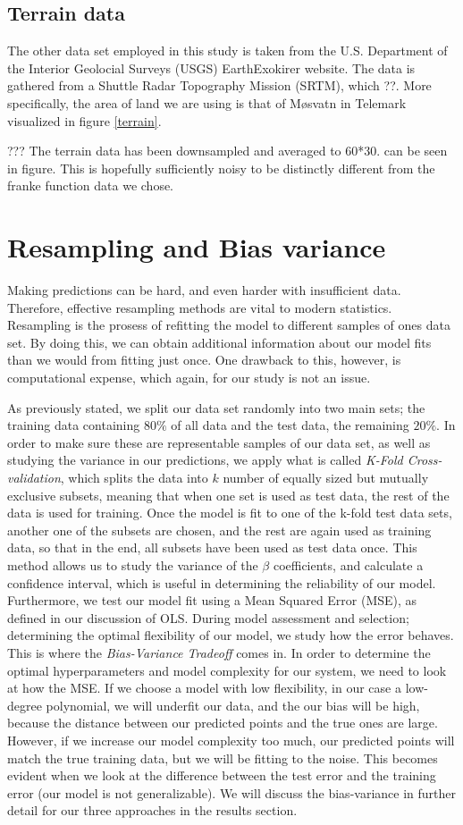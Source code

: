 \documentclass[a4paper, twocolumn]{article}
\begin{document}
\subsection{Terrain data}
The other data set employed in this study is taken from the U.S. Department of the Interior Geolocial Surveys (USGS) EarthExokirer website. The data is gathered from a Shuttle Radar Topography Mission (SRTM), which ??. More specifically, the area of land we are using is that of M\o svatn in Telemark visualized in figure \ref{terrain}.

???
The terrain data has been downsampled and averaged to 60*30. can be seen in figure. This is hopefully sufficiently noisy to be distinctly different from the franke function data we chose. 
\section{Resampling and Bias variance}
Making predictions can be hard, and even harder with insufficient data. Therefore, effective resampling methods are vital to modern statistics. Resampling is the prosess of refitting the model to different samples of ones data set. By doing this, we can obtain additional information about our model fits than we would from fitting just once. One drawback to this, however, is computational expense, which again, for our study is not an issue.

As previously stated, we split our data set randomly into two main sets; the training data containing $80 \%$ of all data and the test data, the remaining $20\%$. In order to make sure these are representable samples of our data set, as well as studying the variance in our predictions, we apply what is called \textit{K-Fold Cross-validation}, which splits the data into $k$ number of equally sized but mutually exclusive subsets, meaning that when one set is used as test data, the rest of the data is used for training. Once the model is fit to one of the k-fold test data sets, another one of the subsets are chosen, and the rest are again used as training data, so that in the end, all subsets have been used as test data once.
This method allows us to study the variance of the $\beta$ coefficients, and calculate a confidence interval, which is useful in determining the reliability of our model. Furthermore, we test our model fit using a Mean Squared Error (MSE), as defined in our discussion of OLS. During model assessment and selection; determining the optimal flexibility of our model, we study how the error behaves. This is where the \textit{Bias-Variance Tradeoff} comes in. In order to determine the optimal hyperparameters and model complexity for our system, we need to look at how the MSE. If we choose a model with low flexibility, in our case a low-degree polynomial, we will underfit our data, and the our bias will be high, because the distance between our predicted points and the true ones are large. However, if we increase our model complexity too much, our predicted points will match the true training data, but we will be fitting to the noise. This becomes evident when we look at the difference between the test error and the training error (our model is not generalizable). We will discuss the bias-variance in further detail for our three approaches in the results section.
\end{document}
